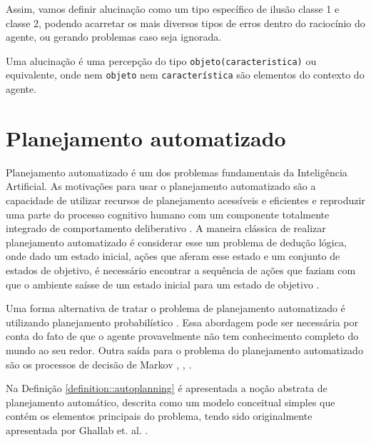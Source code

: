 Assim, vamos definir alucinação como um tipo específico de ilusão classe 1 e classe 2, podendo acarretar os mais diversos tipos de erros dentro do raciocínio do agente, ou gerando problemas caso seja ignorada.

\begin{definition}{}
   Uma alucinação é uma percepção do tipo \texttt{objeto(caracteristica)} ou equivalente, onde nem \texttt{objeto} nem \texttt{característica} são elementos do contexto do agente.
\end{definition}

\section{Planejamento automatizado}

Planejamento automatizado é um dos problemas fundamentais da Inteligência Artificial. As motivações para usar o planejamento automatizado são a capacidade de utilizar recursos de planejamento acessíveis e eficientes e reproduzir uma parte do processo cognitivo humano com um componente totalmente integrado de comportamento deliberativo \cite{GHALLAB20041}. A maneira clássica de realizar planejamento automatizado é considerar esse um problema de dedução lógica, onde dado um estado inicial, ações que aferam esse estado e um conjunto de estados de objetivo, é necessário encontrar a sequência de ações que faziam com que o ambiente saísse de um estado inicial para um estado de objetivo \cite{MADANI20035}.

Uma forma alternativa de tratar o problema de planejamento automatizado é utilizando planejamento probabilístico \cite{KUSHMERICK1995239}. Essa abordagem pode ser necessária por conta do fato de que o agente provavelmente não tem conhecimento completo do mundo ao seu redor. Outra saída para o problema do planejamento automatizado são os processos de decisão de Markov \cite{Cassandra:1998:EAA:926710}, \cite{DBLP:journals/corr/abs-1105-5460}, \cite{article}.

Na Definição \ref{definition::autoplanning} é apresentada a noção abstrata de planejamento automático, descrita como um modelo conceitual simples que contém os elementos principais do problema, tendo sido originalmente apresentada por Ghallab et. al. \cite{GHALLAB20041}.

